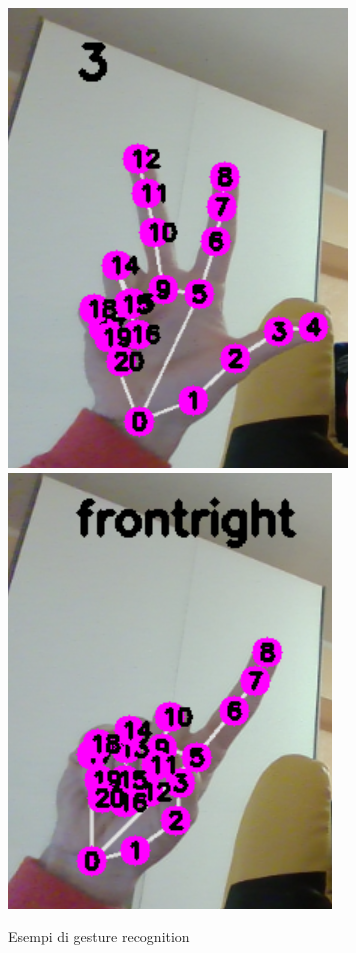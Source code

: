 \documentclass[]{article}
\begin{document}
 
\begin{figure}[H]
    \centering
    \includegraphics[height=0.4\linewidth]{immagini/mano.png}
    \hspace*{5pt}
    \includegraphics[height=0.4\linewidth]{immagini/mano_2.png}
    \caption{Esempi di gesture recognition}
\end{figure}
\end{document}

